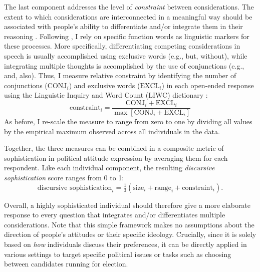 The last component addresses the level of \textit{constraint} between considerations. The extent to which considerations are interconnected in a meaningful way should be associated with people's ability to differentiate and/or integrate them in their reasoning \citep{tetlock1993cognitive}. Following \citet{tausczik2010psychological}, I rely on specific function words as linguistic markers for these processes. More specifically, differentiating competing considerations in speech is usually accomplished using exclusive words (e.g., but, without), while integrating multiple thoughts is accomplished by the use of conjunctions (e.g., and, also). Thus, I measure relative constraint by identifying the number of conjunctions ($\text{CONJ}_i$) and exclusive words ($\text{EXCL}_i$) in each open-ended response using the Linguistic Inquiry and Word Count (LIWC) dictionary \citep{pennebaker2015development}:
\begin{equation}
\text{constraint}_i = \dfrac{\text{CONJ}_i + \text{EXCL}_i}{\max\left[\text{CONJ}_i + \text{EXCL}_i\right]}
\end{equation}
As before, I re-scale the measure to range from zero to one by dividing all values by the empirical maximum observed across all individuals in the data.

Together, the three measures can be combined in a composite metric of sophistication in political attitude expression by averaging them for each respondent. Like each individual component, the resulting \textit{discursive sophistication} score ranges from 0 to 1:
\begin{equation}
\text{discursive sophistication}_i = \tfrac{1}{3}(\text{size}_i + \text{range}_i + \text{constraint}_i).
\end{equation}

Overall, a highly sophisticated individual should therefore give a more elaborate response to every question that integrates and/or differentiates multiple considerations. Note that this simple framework makes no assumptions about the direction of people's attitudes or their specific ideology. Crucially, since it is solely based on \textit{how} individuals discuss their preferences, it can be directly applied in various settings to target specific political issues or tasks such as choosing between candidates running for election.


